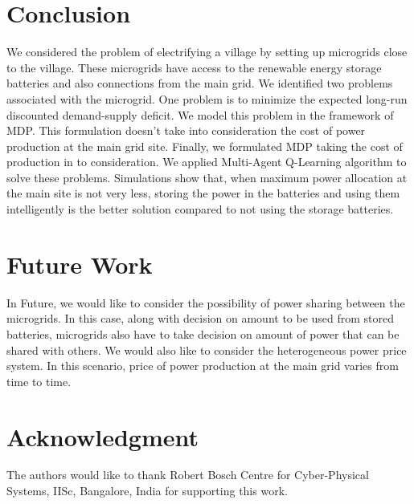 \documentclass[conference]{IEEEtran}
\begin{document}
\section{Conclusion}
We considered the problem of electrifying a village by setting up microgrids close to the village. These microgrids have access to the renewable energy storage batteries and also connections from the main grid. We identified two problems associated with the microgrid. One problem is to minimize the expected long-run discounted demand-supply deficit. We model this problem in the framework of MDP. This formulation doesn't take into consideration the cost of power production at the main grid site. Finally, we formulated MDP taking the cost of production in to consideration. We applied Multi-Agent Q-Learning algorithm to solve these problems. Simulations show that, when maximum power allocation at the main site is not very less, storing the power in the batteries and using them intelligently is the better solution compared to not using the storage batteries. 

\section{Future Work}
In Future, we would like to consider the possibility of power sharing between the microgrids. In this case, along with decision on amount to be used from stored batteries, microgrids also have to take decision on amount of power that can be shared with others. We would also like to consider the  heterogeneous power price system. In this scenario, price of power production at the main grid varies from time to time. 



\section*{Acknowledgment}

The authors would like to thank Robert Bosch Centre for Cyber-Physical Systems, IISc, Bangalore, India for supporting this work.


 
 




\end{document}
